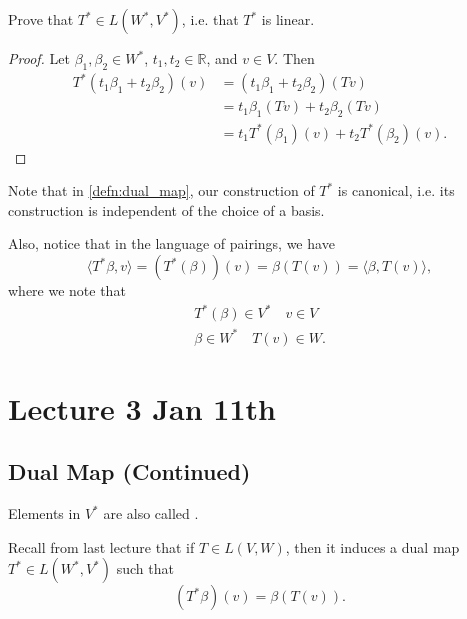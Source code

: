 \documentclass[notoc,notitlepage]{tufte-book}
\begin{document}
\begin{ex}
  Prove that $T^* \in L(W^*, V^*)$, i.e. that $T^*$ is linear.
\end{ex}

\begin{proof}
  Let $\beta_1, \beta_2 \in W^*$, $t_1, t_2 \in \mathbb{R}$, and $v \in V$.
  Then
  \begin{align*}
    T^*(t_1 \beta_1 + t_2 \beta_2)(v)
      &= (t_1 \beta_1 + t_2 \beta_2)(Tv) \\
      &= t_1 \beta_1 (Tv) + t_2 \beta_2 (Tv) \\
      &= t_1 T^*(\beta_1)(v) + t_2 T^*(\beta_2)(v).
  \end{align*}
\end{proof}

\begin{note}
  Note that in \cref{defn:dual_map}, our construction of $T^*$ is canonical,
  i.e. its construction is independent of the choice of a basis.

  Also, notice that in the language of pairings, we have
  \begin{equation*}
    \langle T^*\beta, v \rangle = (T^*(\beta))(v) = \beta(T(v)) = \langle \beta, T(v) \rangle,
  \end{equation*}
  where we note that
  \begin{gather*}
    T^*(\beta) \in V^* \quad v \in V \\
    \beta \in W^* \quad T(v) \in W.
  \end{gather*}
\end{note}



\chapter{Lecture 3 Jan 11th}%
\label{chp:lecture_3_jan_11th}

\section{Dual Map (Continued)}%
\label{sec:dual_map_continued}

\begin{note}
  Elements in $V^*$ are also called .
\end{note}

Recall from last lecture that if $T \in L(V, W)$, then it
induces a dual map $T^* \in L(W^*, V^*)$ such that
\begin{equation*}
  (T^* \beta)(v) = \beta (T(v)).
\end{equation*}
\end{document}
